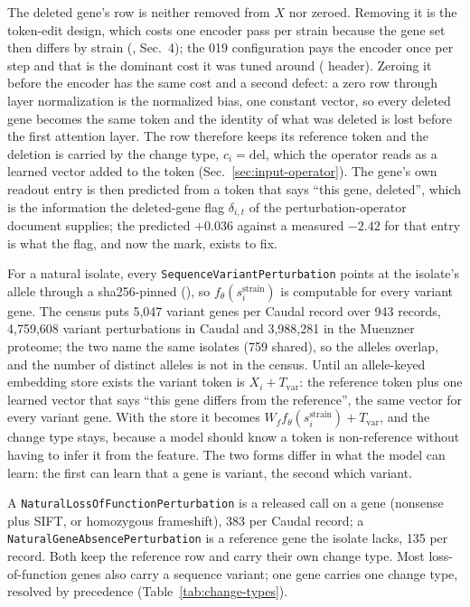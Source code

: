 The deleted gene's row is neither removed
from $X$ nor zeroed. Removing it is the token-edit design, which costs one encoder pass
per strain because the gene set then differs by strain
(, Sec.~4); the 019 configuration pays the encoder
once per step and that is the dominant cost it was tuned around (
header). Zeroing it before the encoder has the same cost and a second defect: a zero row
through layer normalization is the normalized bias, one constant vector, so every
deleted gene becomes the same token and the identity of what was deleted is lost before
the first attention layer. The row therefore keeps its reference token and the deletion
is carried by the change type, $c_i=\mathrm{del}$, which the operator reads as a
learned vector added to the token (Sec.~\ref{sec:input-operator}). The gene's own
readout entry is then predicted from a token that says ``this gene, deleted'', which
is the information the deleted-gene flag $\delta_{i,t}$ of the perturbation-operator
document supplies; the predicted $+0.036$ against a measured $-2.42$ for that entry is
what the flag, and now the mark, exists to fix.

For a natural isolate, every \texttt{SequenceVariantPerturbation} points at the
isolate's allele through a sha256-pinned 
(), so
$f_\theta(s_i^{\mathrm{strain}})$ is computable for every variant gene. The census
puts 5{,}047 variant genes per Caudal record over 943 records, 4{,}759{,}608 variant
perturbations in Caudal and 3{,}988{,}281 in the Muenzner proteome; the two name the same
isolates (759 shared), so the alleles overlap, and the number of distinct alleles is not
in the census. Until an allele-keyed embedding store exists the variant token is
$X_i+T_{\mathrm{var}}$: the reference token plus one learned vector that says ``this
gene differs from the reference'', the same vector for every variant gene. With the
store it becomes $W_f f_\theta(s_i^{\mathrm{strain}})+T_{\mathrm{var}}$, and the change
type stays, because a model should know a token is non-reference without having to
infer it from the feature. The two forms differ in what the model can learn: the first
can learn that a gene is variant, the second which variant.

 A \texttt{NaturalLossOfFunctionPerturbation} is a
released call on a gene (nonsense plus SIFT, or homozygous frameshift), 383 per Caudal
record; a \texttt{NaturalGeneAbsencePerturbation} is a reference gene the isolate lacks,
135 per record. Both keep the reference row and carry their own change type. Most
loss-of-function genes also carry a sequence variant; one gene carries one change type,
resolved by precedence (Table~\ref{tab:change-types}).

